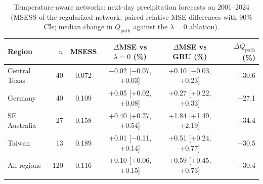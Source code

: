 \begin{table}[tbp]
\caption{Temperature-aware networks: next-day precipitation forecasts on 2001--2024 (MSESS of the regularized network;
paired relative MSE differences with 90\% CIs; median change in $Q_{\mathrm{path}}$ against the
$\lambda=0$ ablation).}
\label{tab:forecastmv}
\footnotesize\setlength{\tabcolsep}{4pt}
\begin{tabular*}{\textwidth}{@{\extracolsep\fill}lrcccr}
\toprule
Region & $n$ & MSESS & $\Delta$MSE vs $\lambda=0$ (\%) & $\Delta$MSE vs GRU (\%) & $\Delta Q_{\mathrm{path}}$ (\%)\\
\midrule
Central Texas & 40 & 0.072 & $-$0.02 [$-$0.07, +0.03] & +0.10 [$-$0.03, +0.23] & $-$30.6 \\
Germany & 40 & 0.109 & +0.05 [+0.02, +0.08] & +0.27 [+0.22, +0.33] & $-$27.1 \\
SE Australia & 27 & 0.158 & +0.40 [+0.27, +0.54] & +1.84 [+1.49, +2.19] & $-$34.4 \\
Taiwan & 13 & 0.189 & +0.01 [$-$0.11, +0.14] & +0.51 [+0.24, +0.77] & $-$30.5 \\
All regions & 120 & 0.116 & +0.10 [+0.06, +0.15] & +0.59 [+0.45, +0.73] & $-$30.4 \\
\botrule
\end{tabular*}
\end{table}
